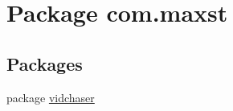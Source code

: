 \hypertarget{namespacecom_1_1maxst}{}\section{Package com.\+maxst}
\label{namespacecom_1_1maxst}
\subsection*{Packages}
\begin{DoxyCompactItemize}
\item 
package \hyperlink{namespacecom_1_1maxst_1_1vidchaser}{vidchaser}
\end{DoxyCompactItemize}
